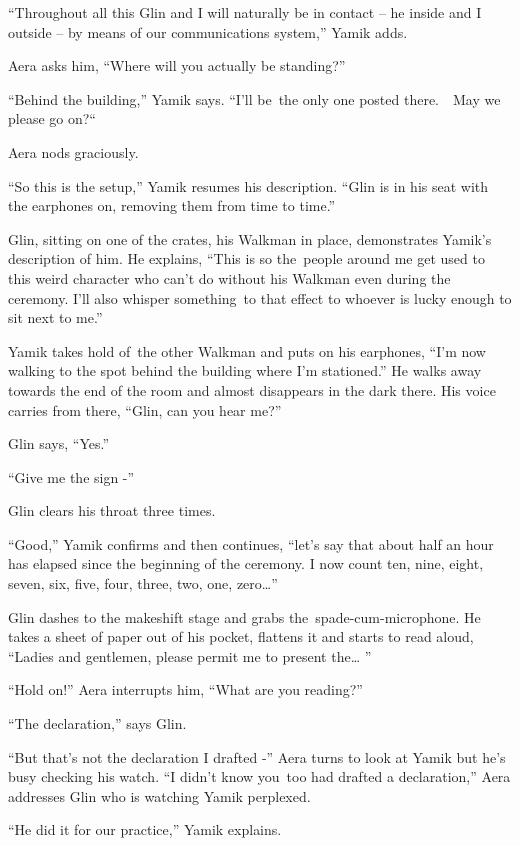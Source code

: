\documentclass[twoside,11pt]{book}
\begin{document}
``Throughout all this Glin and I will naturally be in contact -- he inside and I outside --  by means of
our communications system,'' Yamik adds.

Aera asks him, ``Where will you actually be standing?'' 

``Behind the building,'' Yamik says. ``I'll be~the only one posted
there.{\ \ }May we please go on?``\ \ 

Aera nods graciously.

``So this is the setup,'' Yamik resumes his description. ``Glin is in his seat
with the earphones on, removing them from time to time.'' 

Glin, sitting on one of the crates, his Walkman in place, demonstrates Yamik's description of him. He explains,
``This is so the{\ }people around me get used to this weird
character who can't do without his Walkman even during the ceremony. I'll also whisper something~to that effect to
whoever is lucky enough to sit next to me.'' 

Yamik takes hold of~the other Walkman and puts on his earphones, ``I'm now walking to the spot behind the
building where I'm stationed.'' He walks away towards the end of the room and almost disappears in the
dark there. His voice carries from there, ``Glin, can you hear me?'' 

Glin says, ``Yes.'' 

``Give me the sign -''

Glin clears his throat three times. 

``Good,'' Yamik confirms and then continues, ``let's say that about half an hour
has elapsed since the beginning of the ceremony. I now count ten, nine, eight, seven, six, five, four, three, two, one,
zero{\dots}'' 

Glin dashes to the makeshift stage and grabs the{\ }spade-cum-microphone. He takes a sheet of paper out
of his pocket, flattens it and starts to read aloud, ``Ladies and gentlemen, please permit me to present
the{\dots} '' 

``Hold on!'' Aera interrupts him, ``What are you reading?'' 

``The declaration,'' says Glin. 

``But that's not the declaration I drafted -'' Aera turns to look at Yamik but he's busy
checking his watch. ``I didn't know you\ too had drafted a declaration,'' Aera addresses Glin
who is watching Yamik perplexed.

``He did it for our practice,'' Yamik explains. 
\end{document}
